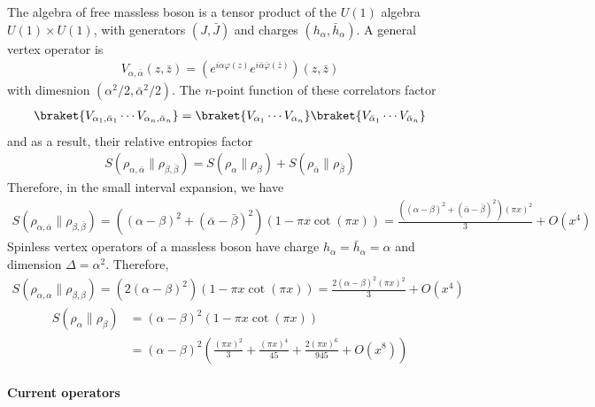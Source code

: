 \documentclass[11pt]{article}
\newcommand{\lb}{\left(}
\newcommand{\rb}{\right)}
\begin{document}
  The algebra of free massless boson is a tensor product of the $U(1)$ algebra $U(1)\times U(1)$, with generators $(J,\bar{J})$ and charges $(h_\alpha,\bar{h}_\alpha)$. A general vertex operator is
  \begin{align}
    V_{\alpha,\bar{\alpha}}(z,\bar{z})=(e^{i\alpha \varphi(z)}e^{i\bar{\alpha}\bar{\varphi}(\bar{z})})(z,\bar{z})
  \end{align}
  with dimesnion $(\alpha^2/2,\bar{\alpha}^2/2)$. The $n$-point function of these correlators factor 
  \begin{align}
    \braket{V_{\alpha_1,\bar{\alpha}_1}\cdots V_{\alpha_n,\bar{\alpha}_n}}=\braket{V_{\alpha_1}\cdots V_{\alpha_n}}\braket{V_{\bar{\alpha}_1}\cdots V_{\bar{\alpha}_n}}
  \end{align}
  and as a result, their relative entropies factor
  \begin{align}
  S(\rho_{\alpha,\bar{\alpha}}\|\rho_{\beta,\bar{\beta}})=S(\rho_{\alpha}\|\rho_{\beta})+S(\rho_{\bar{\alpha}}\|\rho_{\bar{\beta}})
  \end{align}
  Therefore, in the small interval expansion, we have
  \begin{align}\label{smallxCoherentstates}
\boxed{S(\rho_{\alpha,\bar{\alpha}}\|\rho_{\beta,\bar{\beta}})=((\alpha-\beta)^2+(\bar{\alpha}-\bar{\beta})^2)(1-\pi x\cot(\pi x))=\frac{((\alpha-\beta)^2+(\bar{\alpha}-\bar{\beta})^2)(\pi x)^2}{3}+O(x^4)}
  \end{align}
  Spinless vertex operators of a massless boson have charge $h_\alpha=\bar{h}_\alpha=\alpha$ and dimension $\Delta=\alpha^2$. Therefore,
  \begin{align}
  S(\rho_{\alpha,\alpha}\|\rho_{\beta,\beta})=(2(\alpha-\beta)^2)(1-\pi x\cot(\pi x))=\frac{2(\alpha-\beta)^2(\pi x)^2}{3}+O(x^4)
  \end{align}
    \begin{align}
  S(\rho_{\alpha}\|\rho_{\beta})&=(\alpha-\beta)^2(1-\pi x\cot(\pi x))\\
  &= (\alpha -\beta)^2\lb \frac{(\pi x)^2}{3} + \frac{(\pi x)^4}{45}  + \frac{2(\pi x)^6}{945} + O(x^8)\rb
  \end{align}

  \paragraph{Current operators}
\end{document}
